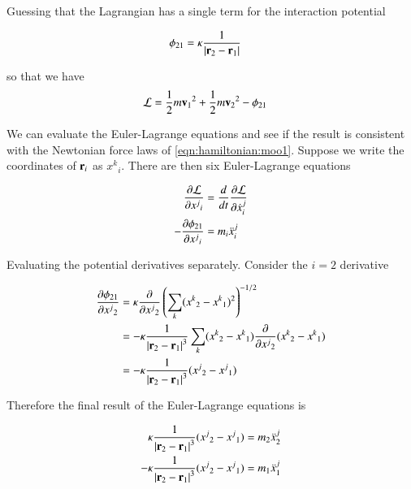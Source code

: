 Guessing that the Lagrangian has a single term for the interaction potential

\begin{align}\label{eqn:hamiltonian:moo2}
\phi_{21} &= \kappa \inv{\Abs{\Br_2 - \Br_1}} 
\end{align}

so that we have
\begin{align}\label{eqn:hamiltonian:moo3}
\LL &= \inv{2} m {\Bv_1}^2 +\inv{2} m {\Bv_2}^2 - \phi_{21}
\end{align}

We can evaluate the Euler-Lagrange equations and see if the result is consistent with the Newtonian force laws of \ref{eqn:hamiltonian:moo1}.  Suppose we write the coordinates of $\Br_i$ as ${x^k}_i$.  There are then six Euler-Lagrange equations 

\begin{align*}
\PD{{x^j}_i}{\LL} &= \frac{d}{dt} \PD{{\dot{x}^j}_i}{\LL} \\
-\PD{{x^j}_i}{\phi_{21}} &= m_i {\ddot{x}^j}_i
\end{align*}

Evaluating the potential derivatives separately.  Consider the $i=2$ derivative

\begin{align*}
\PD{{x^j}_2}{\phi_{21}}
&= 
\kappa \PD{{x^j}_2}{} \left( \sum_k ({x^k}_2 - {x^k}_1)^2 \right)^{-1/2} \\
&=
-\kappa \inv{\Abs{\Br_2 - \Br_1}^3} \sum_k ({x^k}_2 - {x^k}_1) \PD{{x^j}_2}{} ({x^k}_2 - {x^k}_1) \\
&=
-\kappa \inv{\Abs{\Br_2 - \Br_1}^3} ({x^j}_2 - {x^j}_1)
\end{align*}


Therefore the final result of the Euler-Lagrange equations is

\begin{align}\label{eqn:hamiltonian:moo4}
\kappa \inv{\Abs{\Br_2 - \Br_1}^3} ({x^j}_2 - {x^j}_1) &= m_2 {\ddot{x}^j}_2 \\
-\kappa \inv{\Abs{\Br_2 - \Br_1}^3} ({x^j}_2 - {x^j}_1) &= m_1 {\ddot{x}^j}_1
\end{align}

